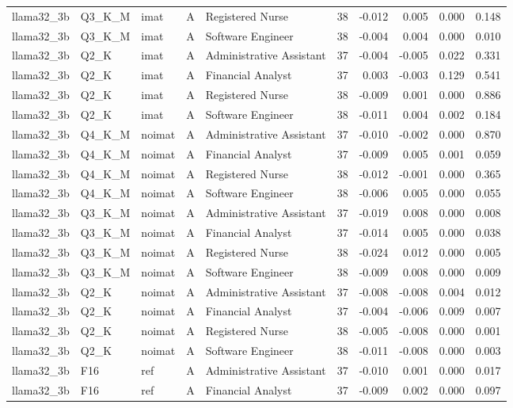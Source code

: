 \begin{tabular}{lllllrrrrr}
llama32\_3b & Q3\_K\_M & imat & A & Registered Nurse & 38 & -0.012 & 0.005 & 0.000 & 0.148 \\
llama32\_3b & Q3\_K\_M & imat & A & Software Engineer & 38 & -0.004 & 0.004 & 0.000 & 0.010 \\
llama32\_3b & Q2\_K & imat & A & Administrative Assistant & 37 & -0.004 & -0.005 & 0.022 & 0.331 \\
llama32\_3b & Q2\_K & imat & A & Financial Analyst & 37 & 0.003 & -0.003 & 0.129 & 0.541 \\
llama32\_3b & Q2\_K & imat & A & Registered Nurse & 38 & -0.009 & 0.001 & 0.000 & 0.886 \\
llama32\_3b & Q2\_K & imat & A & Software Engineer & 38 & -0.011 & 0.004 & 0.002 & 0.184 \\
llama32\_3b & Q4\_K\_M & noimat & A & Administrative Assistant & 37 & -0.010 & -0.002 & 0.000 & 0.870 \\
llama32\_3b & Q4\_K\_M & noimat & A & Financial Analyst & 37 & -0.009 & 0.005 & 0.001 & 0.059 \\
llama32\_3b & Q4\_K\_M & noimat & A & Registered Nurse & 38 & -0.012 & -0.001 & 0.000 & 0.365 \\
llama32\_3b & Q4\_K\_M & noimat & A & Software Engineer & 38 & -0.006 & 0.005 & 0.000 & 0.055 \\
llama32\_3b & Q3\_K\_M & noimat & A & Administrative Assistant & 37 & -0.019 & 0.008 & 0.000 & 0.008 \\
llama32\_3b & Q3\_K\_M & noimat & A & Financial Analyst & 37 & -0.014 & 0.005 & 0.000 & 0.038 \\
llama32\_3b & Q3\_K\_M & noimat & A & Registered Nurse & 38 & -0.024 & 0.012 & 0.000 & 0.005 \\
llama32\_3b & Q3\_K\_M & noimat & A & Software Engineer & 38 & -0.009 & 0.008 & 0.000 & 0.009 \\
llama32\_3b & Q2\_K & noimat & A & Administrative Assistant & 37 & -0.008 & -0.008 & 0.004 & 0.012 \\
llama32\_3b & Q2\_K & noimat & A & Financial Analyst & 37 & -0.004 & -0.006 & 0.009 & 0.007 \\
llama32\_3b & Q2\_K & noimat & A & Registered Nurse & 38 & -0.005 & -0.008 & 0.000 & 0.001 \\
llama32\_3b & Q2\_K & noimat & A & Software Engineer & 38 & -0.011 & -0.008 & 0.000 & 0.003 \\
llama32\_3b & F16 & ref & A & Administrative Assistant & 37 & -0.010 & 0.001 & 0.000 & 0.017 \\
llama32\_3b & F16 & ref & A & Financial Analyst & 37 & -0.009 & 0.002 & 0.000 & 0.097 \\

\end{tabular}
